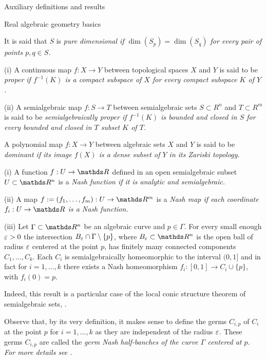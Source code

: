 \documentclass[11pt, a4paper, english, twoside, notitlepage, openright]{report}
\begin{document}
\begin{chapter}{Auxiliary definitions and results}
\begin{section}{Real algebraic geometry basics}
\begin{definition}
	It is said that $S$ is \em pure dimensional \em if $\dim(S_p)=\dim(S_q)$ for every pair of points $p,q\in S$.
\end{definition}

\begin{definitions}\label{properMap}
	  (i) A continuous map $f:X\to Y$ between topological spaces $X$ and $Y$ is said to be \em proper \em if $f^{-1}(K)$ is a compact subspace of $X$ for every compact subspace $K$ of $Y$. 
	  
	  (ii) A semialgebraic map $f:S\to T$ between semialgebraic sets $S\subset R^n$ and $T\subset R^m$ is said to be \em semialgebraically proper \em if $f^{-1}(K)$ is bounded and closed in $S$ for every bounded and closed in $T$ subset $K$ of $T$.  
\end{definitions}

\begin{definition}\label{dominant}
	A polynomial map $f:X\to Y$ between algebraic sets $X$ and $Y$ is said to be \em dominant \em if its image $f(X)$ is a dense subset of $Y$ in its Zariski topology. 
\end{definition}

\begin{definitions}\label{curveGerms}
	(i) A function $f:U\to\R$ defined in an open semialgebraic subset $U\subset\R^n$ is a \em Nash function \em if it is analytic and semialgebraic. 
	
	(ii) A map $f:=(f_1,\dots,f_m):U\to\R^m$ is a \em Nash map \em if each coordinate $f_i:U\to\R$ is a Nash function. 
	
	(iii) Let $\Gamma\subset\R^n$ be an algebraic curve and $p\in\Gamma$. For every small enough $\varepsilon>0$ the intersection $B_{\varepsilon}\cap\Gamma\setminus\{p\}$, where $B_{\eps}\subset\R^n$ is the open ball of radius $\varepsilon$ centered at the point $p$, has finitely many connected components $C_1,\dots,C_k$. Each $C_i$ is semialgebraically homeomorphic to the interval $(0,1]$ and in fact for $i=1,\dots,k$ there exists a Nash homeomorphism  $f_i:[0,1]\to C_i\cup\{p\}$, with $f_i(0)=p$.

Indeed, this result is a particular case of the local conic structure theorem of semialgebraic sets, \cite[IX.3.6]{bcr}. 
	
Observe that, by its very definition, it makes sense to define the germs $C_{i,p}$ of $C_i$ at the point $p$ for $i=1,\dots,k$ as they are independent of the radius $\varepsilon$. These germs  $C_{i,p}$ are called the \em germ Nash half-banches \em of the curve $\Gamma$ centered at $p$. For more details see \cite[IX.5.2]{bcr}. 
\end{definitions}


\end{section}
\end{chapter}
\end{document}
